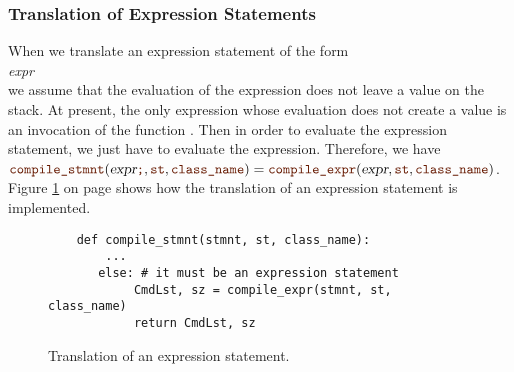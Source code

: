 \subsubsection{Translation of Expression Statements}
When we translate an expression statement of the form
\\[0.2cm]
\hspace*{1.3cm}
\textsl{expr} \mytt{;}
\\[0.2cm]
we assume that the evaluation of the expression does not leave a value on the stack.
At present, the only expression whose evaluation does not create a value is an invocation of the function
.  Then in order to evaluate the expression statement, we just have to evaluate the expression.
Therefore, we have
\\[0.2cm]
\hspace*{1.3cm}
$\mytt{compile\_stmnt}(\textsl{expr}\mytt{;}, \mytt{st}, \mytt{class\_name})
=  \mytt{compile\_expr}(\textsl{expr}, \mytt{st}, \mytt{class\_name})$.
\\[0.2cm]
Figure \ref{fig:Compiler.ipynb:compile:expr_stmnt} on page \pageref{fig:Compiler.ipynb:compile:expr_stmnt} shows how the
translation of an expression statement is implemented.

\begin{figure}[!ht]
\centering
\begin{verbatim}
    def compile_stmnt(stmnt, st, class_name):
        ...
       else: # it must be an expression statement
            CmdLst, sz = compile_expr(stmnt, st, class_name)
            return CmdLst, sz
\end{verbatim}
\vspace*{-0.3cm}
\caption{Translation of an expression statement.}
\label{fig:Compiler.ipynb:compile:expr_stmnt}
\end{figure}


